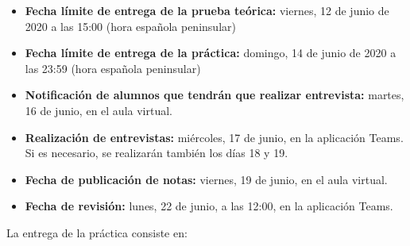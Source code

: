\begin{itemize}
  \item \textbf{Fecha límite de entrega de la prueba teórica:} viernes, 12 de junio de 2020 a las 15:00 (hora española peninsular)

  \item \textbf{Fecha límite de entrega de la práctica:} domingo, 14 de junio de 2020 a las 23:59 (hora española peninsular)

  \item \textbf{Notificación de alumnos que tendrán que realizar entrevista:} martes, 16 de junio, en el aula virtual.

  \item \textbf{Realización de entrevistas:} miércoles, 17 de junio, en la aplicación Teams. Si es necesario, se realizarán también los días 18 y 19.
    
  \item \textbf{Fecha de publicación de notas:} viernes, 19 de junio, en el aula virtual.

  \item \textbf{Fecha de revisión:} lunes, 22 de junio, a las 12:00, en la aplicación Teams.
\end{itemize}

La entrega de la práctica consiste en:

